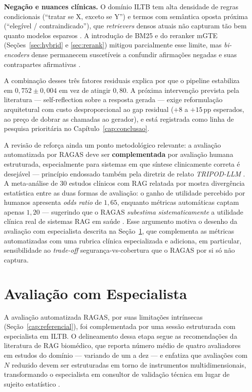 \documentclass[
  12pt,
  oneside,
  a4paper,
  english,
  brazil
]{abntex2}
\begin{document}
\textbf{Negação e nuances clínicas.} O domínio ILTB tem alta densidade de
regras condicionais (``tratar se X, exceto se Y'') e termos com semântica
oposta próxima (``elegível / contraindicado''), que \textit{retrievers}
densos atuais não capturam tão bem quanto modelos esparsos
\cite{cormack2009, formal2021}. A introdução de BM25 e do reranker
mGTE (Seções~\ref{sec:hybrid} e \ref{sec:rerank}) mitigou parcialmente esse
limite, mas \textit{bi-encoders} dense permanecem suscetíveis a confundir
afirmações negadas e suas contrapartes afirmativas
\cite{huang2023halucination}.

A combinação desses três fatores residuais explica por que o pipeline
estabiliza em $0{,}752 \pm 0{,}004$ em vez de atingir $0{,}80$. A próxima intervenção
prevista pela literatura --- self-reflection sobre a resposta gerada
\cite{jeong2024selfbiorag} --- exige reformulação arquitetural com custo
desproporcional ao gap residual ($+8$ a $+15$\,pp esperados, ao preço de
dobrar as chamadas ao gerador), e está registrada como linha de pesquisa
prioritária no Capítulo~\ref{cap:conclusao}.

A revisão de \citeauthor{ocaf2024} \cite{ocaf2024} reforça ainda um ponto
metodológico relevante: a avaliação automatizada por RAGAS deve ser
\textbf{complementada} por avaliação humana estruturada, especialmente para
sistemas em que síntese clinicamente correta é desejável --- princípio
endossado também pela diretriz de relato \textit{TRIPOD-LLM}
\cite{gallifant2025tripod}. A meta-análise de 30 estudos clínicos com RAG
relatada por \citeauthor{ocaf2024} mostra divergência estatística entre as
duas formas de avaliação: o ganho de utilidade percebido por humanos
apresenta \textit{odds ratio} de $1{,}65$, enquanto métricas automáticas
captam apenas $1{,}20$ --- sugerindo que o RAGAS \emph{subestima
sistematicamente} a utilidade clínica real de sistemas RAG em saúde
\cite{ocaf2024}. Esse argumento motiva o desenho da avaliação com
especialista descrita na Seção~\ref{sec:sessao-expert}, que complementa as
métricas automatizadas com uma rubrica clínica especializada e adiciona, em
particular, sensibilidade ao \textit{trade-off} segurança-vs-cobertura que
o RAGAS por si só não captura.

\section{Avaliação com Especialista}
\label{sec:sessao-expert}

A avaliação automatizada RAGAS, por suas limitações intrínsecas
(Seção~\ref{cap:referencial}), foi complementada por uma sessão estruturada com
especialista em ILTB. O delineamento dessa etapa segue as recomendações da literatura
de RAG biomédico, que reporta número médio de quatro avaliadores em estudos do
domínio --- variando de um a dez --- e enfatiza que avaliações com $N$ reduzido devem
ser estruturadas em torno de instrumentos multidimensionais, transformando o
especialista em consultor de validação técnica em lugar de sujeito estatístico
\cite{ocaf2024}.
\end{document}
